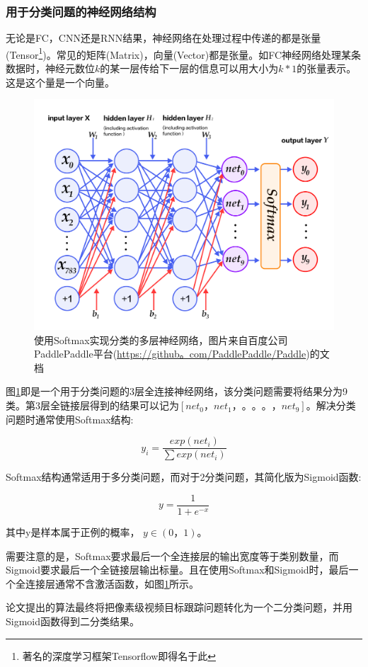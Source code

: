 \subsubsection{用于分类问题的神经网络结构}
\par
无论是FC，CNN还是RNN结果，神经网络在处理过程中传递的都是张量(Tensor\footnote{著名的深度学习框架Tensorflow\supercite{abadi2016tensorflow}即得名于此})。常见的矩阵(Matrix)，向量(Vector)都是张量。如FC神经网络处理某条数据时，神经元数位$k$的某一层传给下一层的信息可以用大小为$k*1$的张量表示。这是这个量是一个向量。
\par
\begin{figure}[htbp!]
    \centering
    \includegraphics[width = 1.\textwidth]{chap/img/mlp_paddle.png}
    \caption{
        使用Softmax实现分类的多层神经网络，图片来自百度公司PaddlePaddle平台(\url{https://github。com/PaddlePaddle/Paddle})的文档\supercite{recognize_digits_paddle}
        }\label{fig:mlp_paddle}
\end{figure}
\par
图\ref{fig:mlp_paddle}即是一个用于分类问题的3层全连接神经网络，该分类问题需要将结果分为9类。第3层全链接层得到的结果可以记为$[net_0，net_1，。。。，net_9]$。解决分类问题时通常使用Softmax结构:
\par
\begin{equation} y_i = \frac{exp(net_i)}{\sum{ exp(net_i) }}  \end{equation}
\par
Softmax结构通常适用于多分类问题，而对于2分类问题，其简化版为Sigmoid函数:
\par
\begin{equation} y = \frac{1}{1+e^{-x}}  \end{equation}
\par
其中y是样本属于正例的概率， $y\in (0，1)$。
\par
需要注意的是，Softmax要求最后一个全连接层的输出宽度等于类别数量，而Sigmoid要求最后一个全链接层输出标量。且在使用Softmax和Sigmoid时，最后一个全连接层通常不含激活函数，如图\ref{fig:mlp_paddle}所示。
\par
论文提出的算法最终将把像素级视频目标跟踪问题转化为一个二分类问题，并用Sigmoid函数得到二分类结果。

